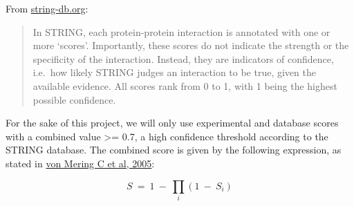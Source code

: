 From
\href{https://string-db.org/cgi/info.pl?footer_active_subpage=scores}{string-db.org}:

\begin{quote}
In STRING, each protein-protein interaction is annotated with one or
more `scores'. Importantly, these scores do not indicate the strength or
the specificity of the interaction. Instead, they are indicators of
confidence, i.e.~how likely STRING judges an interaction to be true,
given the available evidence. All scores rank from 0 to 1, with 1 being
the highest possible confidence.
\end{quote}

For the sake of this project, we will only use experimental and database
scores with a combined value \textgreater= 0.7, a high confidence
threshold according to the STRING database. The combined score is given
by the following expression, as stated in
\href{https://doi.org/10.1093/nar/gki005}{von Mering C et al, 2005}:

\[S\ =\ 1\ {-}\ {{\prod}_{i}}\left(1\ {-}\ S_{i}\right)\]

\begin{Shaded}
\end{Shaded}

